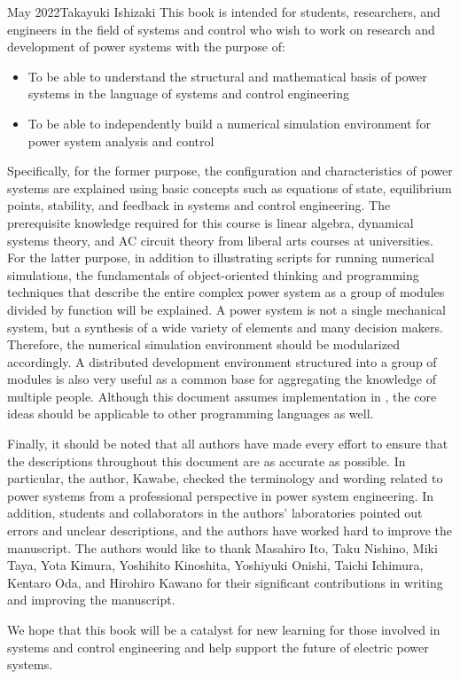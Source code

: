 \begin{preface}{May 2022}{Takayuki Ishizaki}
This book is intended for students, researchers, and engineers in the field of systems and control who wish to work on research and development of power systems with the purpose of:
\begin{itemize}
\item To be able to understand the structural and mathematical basis of power systems in the language of systems and control engineering
\item To be able to independently build a numerical simulation environment for power system analysis and control
\end{itemize}
Specifically, for the former purpose, the configuration and characteristics of power systems are explained using basic concepts such as equations of state, equilibrium points, stability, and feedback in systems and control engineering.
The prerequisite knowledge required for this course is linear algebra, dynamical systems theory, and AC circuit theory from liberal arts courses at universities.
For the latter purpose, in addition to illustrating scripts for running numerical simulations, the fundamentals of object-oriented thinking and programming techniques that describe the entire complex power system as a group of modules divided by function will be explained.
A power system is not a single mechanical system, but a synthesis of a wide variety of elements and many decision makers.
Therefore, the numerical simulation environment should be modularized accordingly.
A distributed development environment structured into a group of modules is also very useful as a common base for aggregating the knowledge of multiple people.
Although this document assumes implementation in \matlab, the core ideas should be applicable to other programming languages as well.

Finally, it should be noted that all authors have made every effort to ensure that the descriptions throughout this document are as accurate as possible.
In particular, the author, Kawabe, checked the terminology and wording related to power systems from a professional perspective in power system engineering.
In addition, students and collaborators in the authors' laboratories pointed out errors and unclear descriptions, and the authors have worked hard to improve the manuscript.
The authors would like to thank Masahiro Ito, Taku Nishino, Miki Taya, Yota Kimura, Yoshihito Kinoshita, Yoshiyuki Onishi, Taichi Ichimura, Kentaro Oda, and Hirohiro Kawano for their significant contributions in writing and improving the manuscript.

We hope that this book will be a catalyst for new learning for those involved in systems and control engineering and help support the future of electric power systems.

\end{preface}


